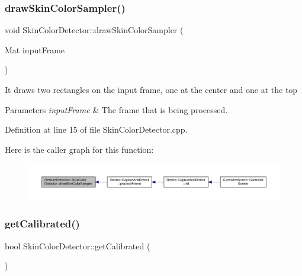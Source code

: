 \subsubsection{\texorpdfstring{draw\+Skin\+Color\+Sampler()}{drawSkinColorSampler()}}
{\footnotesize\ttfamily void Skin\+Color\+Detector\+::draw\+Skin\+Color\+Sampler (\begin{DoxyParamCaption}\item[{Mat}]{input\+Frame }\end{DoxyParamCaption})}

It draws two rectangles on the input frame, one at the center and one at the top


\begin{DoxyParams}{Parameters}
{\em input\+Frame} & The frame that is being processed. \\
\hline
\end{DoxyParams}


Definition at line 15 of file Skin\+Color\+Detector.\+cpp.

Here is the caller graph for this function\+:
\nopagebreak
\begin{figure}[H]
\begin{center}
\leavevmode
\includegraphics[width=350pt]{class_gesture_detection_1_1_skin_color_detector_a4eb701f5b2761027b3e752d6b3de46c2_icgraph}
\end{center}
\end{figure}
\mbox{\label{class_gesture_detection_1_1_skin_color_detector_ad02c96fbc75934c86d22dd90ee726373}} 
\subsubsection{\texorpdfstring{get\+Calibrated()}{getCalibrated()}}
{\footnotesize\ttfamily bool Skin\+Color\+Detector\+::get\+Calibrated (\begin{DoxyParamCaption}{ }\end{DoxyParamCaption})}

